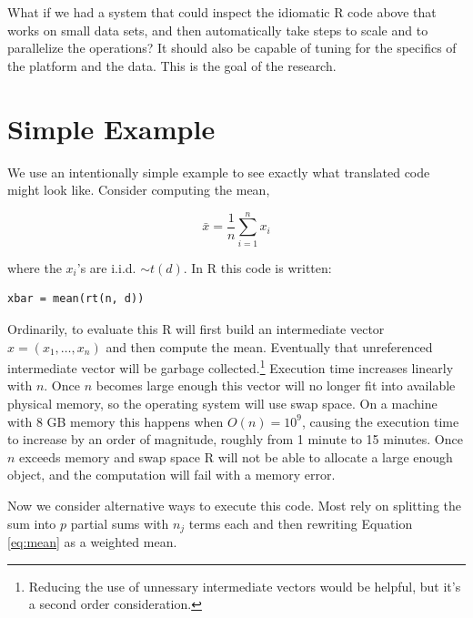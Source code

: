 \documentclass[12pt]{article}
\begin{document}
What if we had a system that could inspect the idiomatic R code above that
works on small data sets, and then automatically take steps to scale and to
parallelize the operations? It should also be capable of tuning for the
specifics of the platform and the data. This is the goal of the research.

\section{Simple Example}


We use an intentionally simple example to see exactly what translated code might look
like.  Consider computing the mean,

\begin{equation}
    \bar{x} = \frac{1}{n} \sum_{i = 1}^n x_i
\label{eq:mean}
\end{equation}

where the $x_i$'s are
i.i.d. $\sim t(d)$.  In R this code is written:

\begin{verbatim}
xbar = mean(rt(n, d))
\end{verbatim}

Ordinarily, to evaluate this R will first build an intermediate vector $x =
(x_1, \dots, x_n)$ and then compute the mean. Eventually that unreferenced
intermediate vector will be garbage collected.\footnote{Reducing the use of
unnessary intermediate vectors would be helpful, but it's a second order
consideration.} Execution time increases linearly with $n$. Once $n$
becomes large enough this vector will no longer fit into available physical
memory, so the operating system will use swap space. On a machine with 8 GB
memory this happens when $O(n) = 10^9$, causing the execution time to
increase by an order of magnitude, roughly from 1 minute to 15 minutes.
Once $n$ exceeds memory and swap space R will not be able to allocate a
large enough object, and the computation will fail with a memory error.

Now we consider alternative ways to execute this code.  Most rely on
splitting the sum into $p$ partial sums with $n_j$ terms each and then rewriting
Equation \ref{eq:mean} as a weighted mean.
\end{document}
